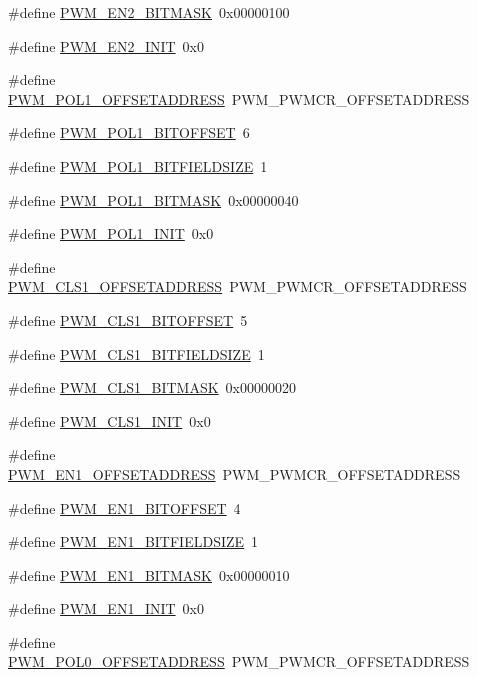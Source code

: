 \begin{DoxyCompactItemize}
\#define \hyperlink{a00565_a3d1cd2162acc720efb1a767901b921a0}{PWM\_\-EN2\_\-BITMASK}~0x00000100
\item 
\#define \hyperlink{a00565_a2e1c438f84f028e37fcddb3aa9a28c73}{PWM\_\-EN2\_\-INIT}~0x0
\item 
\#define \hyperlink{a00565_aac74b5b5be71ba9c30ec30017740bc41}{PWM\_\-POL1\_\-OFFSETADDRESS}~PWM\_\-PWMCR\_\-OFFSETADDRESS
\item 
\#define \hyperlink{a00565_a549bceaced16a3cbb3e435ec9e3bafab}{PWM\_\-POL1\_\-BITOFFSET}~6
\item 
\#define \hyperlink{a00565_aa2a8b0096107ef70cec17fde6fd14087}{PWM\_\-POL1\_\-BITFIELDSIZE}~1
\item 
\#define \hyperlink{a00565_aa52c1424968758179b9f047aa946058d}{PWM\_\-POL1\_\-BITMASK}~0x00000040
\item 
\#define \hyperlink{a00565_a49ab249dcd99072a3eefbcc15f3c8f43}{PWM\_\-POL1\_\-INIT}~0x0
\item 
\#define \hyperlink{a00565_a746ef691be8e0fcde7ccc848780ca9e0}{PWM\_\-CLS1\_\-OFFSETADDRESS}~PWM\_\-PWMCR\_\-OFFSETADDRESS
\item 
\#define \hyperlink{a00565_af9f76b27b56b26bb53b426e0fbf48c85}{PWM\_\-CLS1\_\-BITOFFSET}~5
\item 
\#define \hyperlink{a00565_a914ddc7576bf9a85724a228403093c49}{PWM\_\-CLS1\_\-BITFIELDSIZE}~1
\item 
\#define \hyperlink{a00565_a25ab219a74af0d96b957e5a8247e9f6f}{PWM\_\-CLS1\_\-BITMASK}~0x00000020
\item 
\#define \hyperlink{a00565_ab86d21e8e4c60a9168861b5d7b9544bb}{PWM\_\-CLS1\_\-INIT}~0x0
\item 
\#define \hyperlink{a00565_a7cdc9c922184aaf5dcc31f1894078157}{PWM\_\-EN1\_\-OFFSETADDRESS}~PWM\_\-PWMCR\_\-OFFSETADDRESS
\item 
\#define \hyperlink{a00565_a831752a6986c6120f977ff03f2c88b4d}{PWM\_\-EN1\_\-BITOFFSET}~4
\item 
\#define \hyperlink{a00565_af5bb489f6d7da9acc7f734c170cc4fcc}{PWM\_\-EN1\_\-BITFIELDSIZE}~1
\item 
\#define \hyperlink{a00565_a0e81085a1468c3225dc12d30d0b2d1c0}{PWM\_\-EN1\_\-BITMASK}~0x00000010
\item 
\#define \hyperlink{a00565_a34b74e0e84541202a25b69cba41e8066}{PWM\_\-EN1\_\-INIT}~0x0
\item 
\#define \hyperlink{a00565_a294ebda7eef2c91c8f52559b8789b736}{PWM\_\-POL0\_\-OFFSETADDRESS}~PWM\_\-PWMCR\_\-OFFSETADDRESS
\item 

\end{DoxyCompactItemize}
